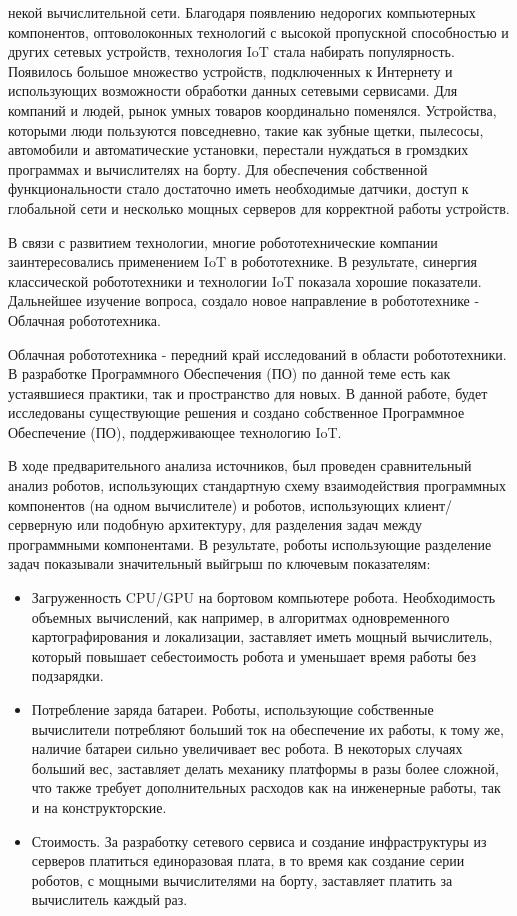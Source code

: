 \documentclass[a4paper, 14pt]{extreport}
\begin{document}
 некой вычислительной сети. Благодаря появлению недорогих компьютерных компонентов, 
 оптоволоконных технологий с высокой пропускной 
 способностью и других сетевых устройств, технология IoT стала набирать популярность. Появилось большое множество устройств, подключенных
 к Интернету и использующих возможности обработки данных сетевыми сервисами. Для компаний и людей, рынок умных товаров координально
 поменялся. Устройства, которыми люди пользуются повседневно, такие как зубные щетки, пылесосы, автомобили и автоматические установки,
 перестали нуждаться в громздких
 программах и вычислителях на борту. Для обеспечения собственной функциональности стало достаточно иметь необходимые датчики, доступ к глобальной сети
 и несколько мощных серверов для корректной работы устройств.
\par В связи с развитием технологии, многие робототехнические компании заинтересовались применением
 IoT в робототехнике. В результате, синергия классической робототехники и технологии IoT показала хорошие показатели. Дальнейшее изучение
 вопроса, создало новое направление в робототехнике - Облачная робототехника\cite{cloudRobotics}\cite{cloudPaper}.
\par Облачная робототехника - передний край исследований в области робототехники. В разработке Программного Обеспечения (ПО) по данной
 теме есть как устаявшиеся практики, так и пространство для новых. В данной работе, будет исследованы существующие решения
 и создано собственное Программное Обеспечение (ПО), поддерживающее технологию IoT.
\par В ходе предварительного анализа источников, был проведен сравнительный анализ роботов, использующих стандартную схему взаимодействия
 программных компонентов (на одном вычислителе) и роботов, использующих клиент/серверную или подобную архитектуру, для разделения задач
 между программными компонентами. В результате, роботы использующие разделение задач показывали значительный выйгрыш по ключевым показателям:
\begin{itemize}
        \item Загруженность CPU/GPU на бортовом компьютере робота. Необходимость объемных вычислений, как например, в алгоритмах одновременного
              картографирования и локализации, заставляет иметь мощный вычислитель, который повышает себестоимость робота и уменьшает время работы без подзарядки.
        \item Потребление заряда батареи. Роботы, использующие собственные вычислители потребляют больший ток на обеспечение их работы,
              к тому же, наличие батареи сильно увеличивает вес робота. В некоторых случаях больший вес, заставляет делать механику платформы в разы более сложной,
              что также требует дополнительных расходов как на инженерные работы, так и на конструкторские.
        \item Стоимость. За разработку сетевого сервиса и создание инфраструктуры из серверов платиться единоразовая плата, в то время как создание
              серии роботов, с мощными вычислителями на борту, заставляет платить за вычислитель каждый раз.
\end{itemize}
\end{document}
